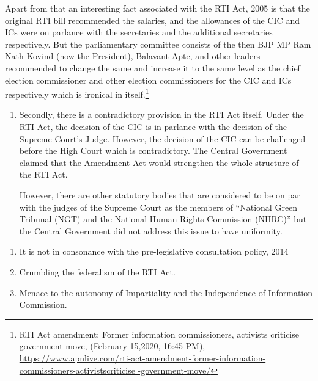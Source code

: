 \begin{multicols}{2}
\noi
Apart from that an interesting fact associated with the RTI Act, 2005 is that the original RTI
bill recommended the salaries, and the allowances of the CIC and ICs were on parlance with 
the secretaries and the additional secretaries respectively. But the parliamentary committee
consists of the then BJP MP Ram Nath Kovind (now the President), Balavant Apte, and other
leaders recommended to change the same and increase it to the same level as the chief
election commissioner and other election commissioners for the CIC and ICs respectively
which is ironical in itself.\footnote{RTI Act amendment: Former information commissioners, activists criticise government move, (February 15,2020, 16:45 PM), \url{https://www.apnlive.com/rti-act-amendment-former-information-commissioners-activistscriticise
-government-move/}}

\vspace{-.3cm}

\begin{enumerate}
\addtocounter{enumi}{1}
\item Secondly, there is a contradictory provision in the RTI Act itself. Under the RTI Act,
the decision of the CIC is in parlance with the decision of the Supreme Court’s Judge.
However, the decision of the CIC can be challenged before the High Court which is
contradictory. The Central Government claimed that the Amendment Act would
strengthen the whole structure of the RTI Act.

However, there are other statutory bodies that are considered to be on par with the
judges of the Supreme Court as the members of “National Green Tribunal (NGT) and
the National Human Rights Commission (NHRC)” but the Central Government did
not address this issue to have uniformity.
\end{enumerate}

\vspace{-.3cm}


\vspace{-.2cm}

\begin{enumerate}
\itemsep=0pt
\item It is not in consonance with the pre-legislative consultation policy, 2014

\item Crumbling the federalism of the RTI Act.

\item Menace to the autonomy of Impartiality and the Independence of Information Commission.


\end{enumerate}
\end{multicols}
